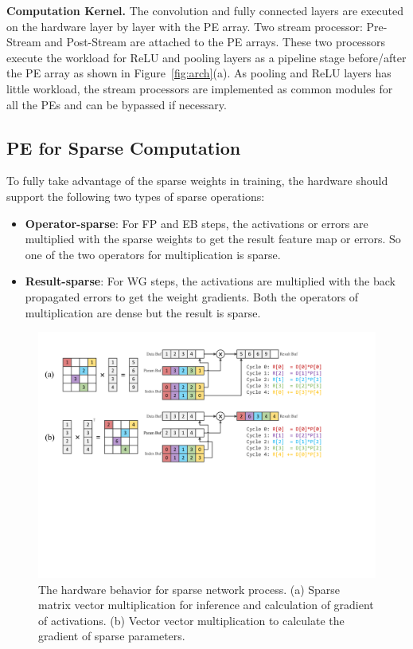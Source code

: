 {\bf Computation Kernel.} The convolution and fully connected layers are executed on the hardware layer by layer with the PE array. Two stream processor: Pre-Stream and Post-Stream are attached to the PE arrays. These two processors execute the workload for ReLU and pooling layers as a pipeline stage before/after the PE array as shown in Figure~\ref{fig:arch}(a). As pooling and ReLU layers has little workload, the stream processors are implemented as common modules for all the PEs and can be bypassed if necessary.

\subsection{PE for Sparse Computation}\label{sec:hw_pe}

To fully take advantage of the sparse weights in training, the hardware should support the following two types of sparse operations:
\begin{itemize}
\item {\bf Operator-sparse}: For FP and EB steps, the activations or errors are multiplied with the sparse weights to get the result feature map or errors. So one of the two operators for multiplication is sparse.
\item {\bf Result-sparse}: For WG steps, the activations are multiplied with the back propagated errors to get the weight gradients. Both the operators of multiplication are dense but the result is sparse.
\end{itemize}

\begin{figure}[htbp] 
  \centering
  \includegraphics[width=1.8\columnwidth]{figures/sparse_mv.pdf}
  \caption{The hardware behavior for sparse network process. (a) Sparse matrix vector multiplication for inference and calculation of gradient of activations. (b) Vector vector multiplication to calculate the gradient of sparse parameters. }
  \label{fig:spmv}
\end{figure}


